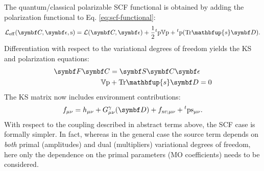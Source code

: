 The quantum/classical polarizable \acrshort{SCF} functional is obtained by adding the
polarization functional to Eq. \eqref{eq:scf-functional}:
\begin{equation}\label{eq:polarizable-scf-functional}
  \mathcal{L}_\mathrm{eff}(\mat{C}, \mat{\epsilon}, \s) =
  \mathcal{L}(\mat{C}, \mat{\epsilon}) +
  \frac{1}{2}{}^t\p\V\p + {}^t\p(\Tr\mathbfup{s}\mat{D}).
\end{equation}
Differentiation with respect to the variational degrees of freedom
yields the \acrshort{KS} and polarization equations:
\begin{subequations}
  \begin{align}
    \mat{F}\mat{C} &= \mat{S}\mat{C}\mat{\epsilon} \\
    \V\p &+ \Tr\mathbfup{s}\mat{D} = 0 \label{eq:polarization-stat}
  \end{align}
\end{subequations}
The \acrshort{KS} matrix now includes environment contributions:
\begin{equation}
  f_{\mu\nu} = h_{\mu\nu}  + G^\gamma_{\mu\nu}(\mat{D}) + f_{\mathrm{xc};\mu\nu}
  + {}^t\p\s_{\mu\nu}.
\end{equation}
With respect to the coupling described in abstract terms above, the
\acrshort{SCF} case is formally simpler. In fact, whereas in the
general case the source term depends on \emph{both} primal (amplitudes)
and dual (multipliers) variational degrees of freedom, here only the
dependence on the primal parameters (\acrshort{MO} coefficients) needs
to be considered.\autocite{Lipparini2011-aj}
